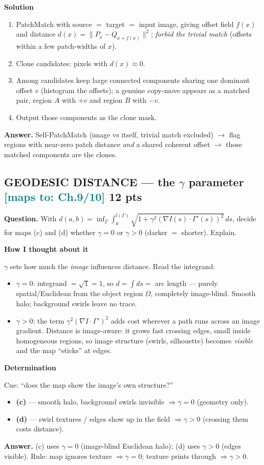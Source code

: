 \documentclass[11pt]{article}
\newcommand{\step}[1]{\smallskip\par\noindent\textbf{\textcolor{amber}{#1}}\par\nobreak}
\newcommand{\maps}[1]{{\small\textcolor{teal}{[maps to: #1]}}}
\newcommand{\ans}[1]{\begin{answer}\textbf{Answer.} #1\end{answer}}
\begin{document}
\step{Solution}
\begin{enumerate}
  \item PatchMatch with source $=$ target $=$ input image, giving offset field $f(x)$ and distance
  $d(x)=\|P_x-Q_{x+f(x)}\|^2$; \emph{forbid the trivial match} (offsets within a few patch-widths of $x$).
  \item Clone candidates: pixels with $d(x)\approx 0$.
  \item Among candidates keep large connected components sharing one dominant offset $v$ (histogram the offsets);
  a genuine copy-move appears as a matched pair, region $A$ with $+v$ and region $B$ with $-v$.
  \item Output those components as the clone mask.
\end{enumerate}
\ans{Self-PatchMatch (image vs itself, trivial match excluded) $\to$ flag regions with near-zero patch distance
\emph{and} a shared coherent offset $\to$ those matched components are the clones.}

\subsection{GEODESIC DISTANCE --- the $\gamma$ parameter \hfill \maps{Ch.9/10} \hfill \textnormal{\small 12 pts}}
\begin{qbox}\textbf{Question.} With
$d(a,b)=\inf_\Gamma\int_0^{l(\Gamma)}\sqrt{1+\gamma^2(\nabla I(s)\cdot\Gamma'(s))^2}\,ds$, decide for maps (c) and
(d) whether $\gamma=0$ or $\gamma>0$ (darker $=$ shorter). Explain.\end{qbox}

\step{How I thought about it}
$\gamma$ sets how much the \emph{image} influences distance. Read the integrand:
\begin{itemize}
  \item $\gamma=0$: integrand $=\sqrt{1}=1$, so $d=\int ds=$ arc length --- purely spatial/Euclidean from the
  object region $\Omega$, completely image-blind. Smooth halo; background swirls leave no trace.
  \item $\gamma>0$: the term $\gamma^2(\nabla I\cdot\Gamma')^2$ adds cost wherever a path runs across an image
  gradient. Distance is image-aware: it grows fast crossing edges, small inside homogeneous regions, so image
  structure (swirls, silhouette) becomes \emph{visible} and the map ``sticks'' at edges.
\end{itemize}

\step{Determination}
Cue: ``does the map show the image's own structure?''
\begin{itemize}
  \item \textbf{(c)} --- smooth halo, background swirls invisible $\Rightarrow \gamma=0$ (geometry only).
  \item \textbf{(d)} --- swirl textures / edges show up in the field $\Rightarrow \gamma>0$ (crossing them costs
  distance).
\end{itemize}
\ans{(c) uses $\gamma=0$ (image-blind Euclidean halo); (d) uses $\gamma>0$ (edges visible). Rule: map ignores
texture $\Rightarrow\gamma=0$; texture prints through $\Rightarrow\gamma>0$.}
\end{document}
